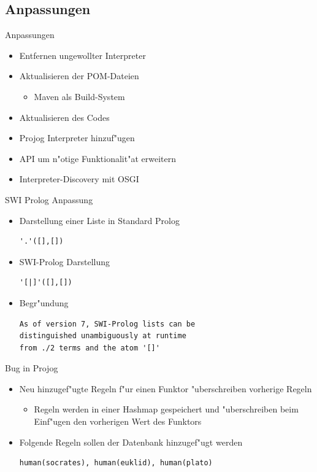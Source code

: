 \documentclass[18pt]{beamer}
\begin{document}
\subsection{Anpassungen}
\begin{frame}{Anpassungen}
\begin{itemize}
\item Entfernen ungewollter Interpreter
\item Aktualisieren der POM-Dateien
\begin{itemize}
\item Maven als Build-System
\end{itemize}
\item Aktualisieren des Codes
\item Projog Interpreter hinzuf"ugen
\item API um n"otige Funktionalit"at erweitern
\item Interpreter-Discovery mit OSGI
\end{itemize}
\end{frame}
\begin{frame}[fragile]{SWI Prolog Anpassung}
\begin{itemize}
\item Darstellung einer Liste in Standard Prolog
\begin{verbatim}
'.'([],[])
\end{verbatim}
\item SWI-Prolog Darstellung
\begin{verbatim}
'[|]'([],[])
\end{verbatim}
\vspace{0.5cm}
\item Begr"undung
\begin{verbatim}
As of version 7, SWI-Prolog lists can be 
distinguished unambiguously at runtime
from ./2 terms and the atom '[]'
\end{verbatim}
\end{itemize}
\end{frame}
\begin{frame}[fragile]{Bug in Projog}
\begin{itemize}
\item Neu hinzugef"ugte Regeln f"ur einen Funktor "uberschreiben vorherige Regeln
\begin{itemize}
\item Regeln werden in einer Hashmap gespeichert und "uberschreiben beim Einf"ugen den vorherigen Wert des Funktors
\end{itemize}
\vspace{0.5cm}
\item Folgende Regeln sollen der Datenbank hinzugef"ugt werden
\begin{verbatim}
human(socrates), human(euklid), human(plato)
\end{verbatim}
\end{itemize}
\end{frame}
\end{document}
